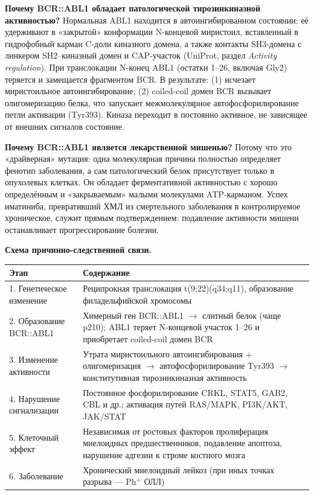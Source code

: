\documentclass[12pt,a4paper]{article}
\newcommand{\code}[1]{{\ttfamily #1}}
\begin{document}
\medskip
\textbf{Почему BCR::ABL1 обладает патологической тирозинкиназной активностью?}
Нормальная ABL1 находится в автоингибированном состоянии: её удерживают в «закрытой»
конформации N-концевой миристоил, вставленный в гидрофобный карман C-доли киназного
домена, а также контакты SH3-домена с линкером SH2--киназный домен и CAP-участок
(UniProt, раздел \emph{Activity regulation}). При транслокации N-конец ABL1 (остатки
1--26, включая Gly2) теряется и замещается фрагментом BCR. В результате:
(1) исчезает миристоильное автоингибирование; (2) coiled-coil домен BCR вызывает
олигомеризацию белка, что запускает межмолекулярное автофосфорилирование петли
активации (Tyr393). Киназа переходит в постоянно активное, не зависящее от внешних
сигналов состояние.

\medskip
\textbf{Почему BCR::ABL1 является лекарственной мишенью?}
Потому что это «драйверная» мутация: одна молекулярная причина полностью определяет
фенотип заболевания, а сам патологический белок присутствует только в опухолевых
клетках. Он обладает ферментативной активностью с хорошо определённым и «закрываемым»
малыми молекулами ATP-карманом. Успех иматиниба, превративший ХМЛ из смертельного
заболевания в контролируемое хроническое, служит прямым подтверждением: подавление
активности мишени останавливает прогрессирование болезни.

\medskip
\noindent\textbf{Схема причинно-следственной связи.}

\begin{center}
\begin{tabular}{L{4.6cm}L{9.9cm}}
\toprule
\textbf{Этап} & \textbf{Содержание} \\
. Генетическое изменение & Реципрокная транслокация t(9;22)(q34;q11), образование филадельфийской хромосомы \\
2. Образование BCR::ABL1 & Химерный ген \code{BCR::ABL1} $\rightarrow$ слитный белок (чаще p210); ABL1 теряет N-концевой участок 1--26 и приобретает coiled-coil домен BCR \\
3. Изменение активности & Утрата миристоильного автоингибирования + олигомеризация $\rightarrow$ автофосфорилирование Tyr393 $\rightarrow$ конститутивная тирозинкиназная активность \\
4. Нарушение сигнализации & Постоянное фосфорилирование CRKL, STAT5, GAB2, CBL и др.; активация путей RAS/MAPK, PI3K/AKT, JAK/STAT \\
5. Клеточный эффект & Независимая от ростовых факторов пролиферация миелоидных предшественников, подавление апоптоза, нарушение адгезии к строме костного мозга \\
6. Заболевание & Хронический миелоидный лейкоз (при иных точках разрыва --- Ph$^+$ ОЛЛ) \\
\bottomrule
\end{tabular}
\end{center}
\end{document}
